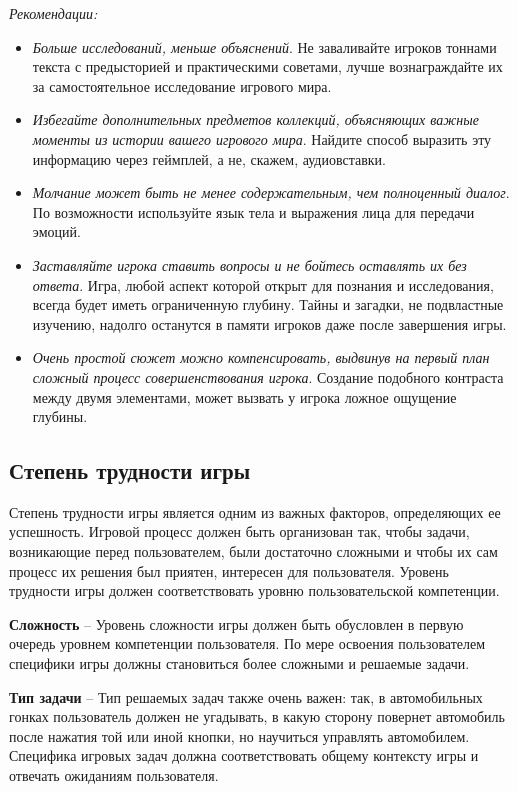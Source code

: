 \documentclass{article}
\begin{document}
\noindent\textit{Рекомендации:}
\begin{itemize}
  \item \textit{Больше исследований, меньше объяснений}. Не заваливайте игроков тоннами текста с предысторией и практическими советами, лучше вознаграждайте их за самостоятельное исследование игрового мира.
  \item \textit{Избегайте дополнительных предметов коллекций, объясняющих важные моменты из истории вашего игрового мира}. Найдите способ выразить эту информацию через геймплей, а не, скажем, аудиовставки.
  \item \textit{Молчание может быть не менее содержательным, чем полноценный диалог}. По возможности используйте язык тела и выражения лица для передачи эмоций.
  \item \textit{Заставляйте игрока ставить вопросы и не бойтесь оставлять их без ответа}. Игра, любой аспект которой открыт для познания и исследования, всегда будет иметь ограниченную глубину. Тайны и загадки, не подвластные изучению, надолго останутся в памяти игроков даже после завершения игры.
  \item \textit{Очень простой сюжет можно компенсировать, выдвинув на первый план сложный процесс совершенствования игрока}. Создание подобного контраста между двумя элементами, может вызвать у игрока ложное ощущение глубины.
\end{itemize}

\subsection{Степень трудности игры}
Степень трудности игры является одним из важных факторов, определяющих ее успешность. Игровой процесс должен быть организован так, чтобы задачи, возникающие перед пользователем, были достаточно сложными и чтобы их сам процесс их решения был приятен, интересен для пользователя. Уровень трудности игры должен соответствовать уровню пользовательской компетенции.

\textbf{Сложность} -- Уровень сложности игры должен быть обусловлен в первую очередь уровнем компетенции пользователя. По мере освоения пользователем специфики игры должны становиться более сложными и решаемые задачи.

\textbf{Тип задачи} -- Тип решаемых задач также очень важен: так, в автомобильных гонках пользователь должен не угадывать, в какую сторону повернет автомобиль после нажатия той или иной кнопки, но научиться управлять автомобилем. Специфика игровых задач должна соответствовать общему контексту игры и отвечать ожиданиям пользователя.
\end{document}
